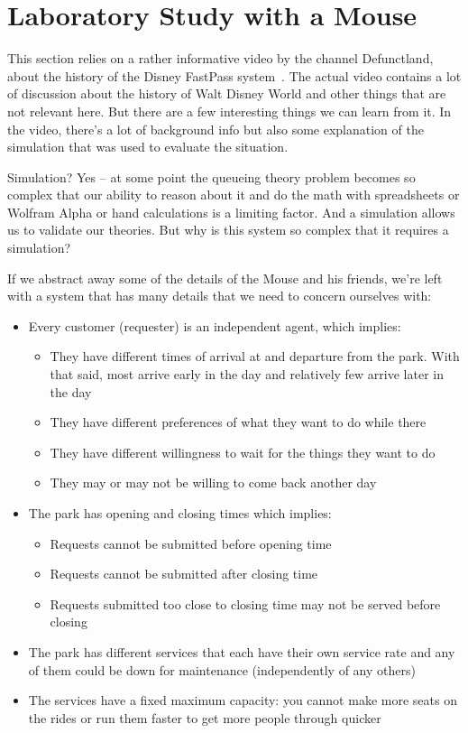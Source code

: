 \section*{Laboratory Study with a Mouse}

This section relies on a rather informative video by the channel Defunctland, about the history of the Disney FastPass system~\cite{dldisney}. The actual video contains a lot of discussion about the history of Walt Disney World and other things that are not relevant here. But there are a few interesting things we can learn from it. In the video, there's a lot of background info but also some explanation of the simulation that was used to evaluate the situation.

Simulation? Yes -- at some point the queueing theory problem becomes so complex that our ability to reason about it and do the math with spreadsheets or Wolfram Alpha or hand calculations is a limiting factor. And a simulation allows us to validate our theories. But why is this system so complex that it requires a simulation?

If we abstract away some of the details of the Mouse and his friends, we're left with a system that has many details that we need to concern ourselves with:

\begin{itemize}
	\item Every customer (requester) is an independent agent, which implies:
		\begin{itemize}
			\item They have different times of arrival at and departure from the park. With that said, most arrive early in the day and relatively few arrive later in the day
			\item They have different preferences of what they want to do while there
			\item They have different willingness to wait for the things they want to do
			\item They may or may not be willing to come back another day
		\end{itemize}
	\item The park has opening and closing times which implies:
		\begin{itemize}
		\item Requests cannot be submitted before opening time
		\item Requests cannot be submitted after closing time
		\item Requests submitted too close to closing time may not be served before closing
		\end{itemize}
	\item The park has different services that each have their own service rate and any of them could be down for maintenance (independently of any others)
	\item The services have a fixed maximum capacity: you cannot make more seats on the rides or run them faster to get more people through quicker
\end{itemize}

